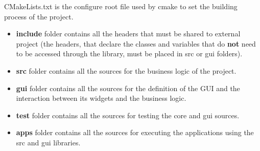 CMakeLists.txt is the configure root file used by cmake to set the
building process of the project.

\begin{itemize}
  \item
        \textbf{include} folder contains all the headers that must be shared
        to external project (the headers, that declare the classes and
        variables that do \textbf{not} need to be accessed through the
        library, must be placed in src or gui folders).
\end{itemize}

\begin{itemize}
  \item
        \textbf{src} folder contains all the sources for the business logic of
        the project.
\end{itemize}

\begin{itemize}
  \item
        \textbf{gui} folder contains all the sources for the definition of the
        GUI and the interaction between its widgets and the business logic.
\end{itemize}

\begin{itemize}
  \item
        \textbf{test} folder contains all the sources for testing the core and
        gui sources.
\end{itemize}

\begin{itemize}
  \item
        \textbf{apps} folder contains all the sources for executing the
        applications using the src and gui libraries.
\end{itemize}
